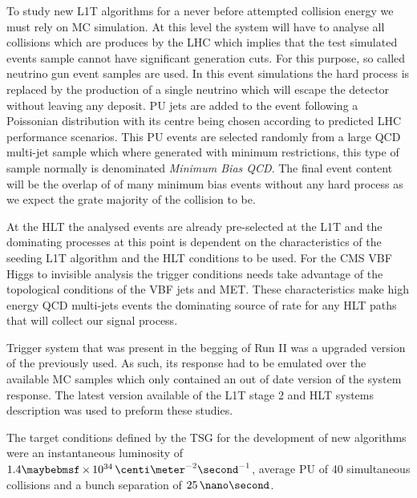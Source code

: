 
To study new \gls{L1T} algorithms for a never before attempted collision energy we must rely on \gls{MC} simulation. At this level the system will have to analyse all collisions which are produces by the \gls{LHC} which implies that the test simulated events sample cannot have significant generation cuts. For this purpose, so called neutrino gun event samples are used. In this event simulations the hard process is replaced by the production of a single neutrino which will escape the detector without leaving any deposit. \acrfull{PU} jets are added to the event following a Poissonian distribution with its centre being chosen according to predicted \gls{LHC} performance scenarios. This \gls{PU} events are selected randomly from a large \gls{QCD} multi-jet sample which where generated with minimum restrictions, this type of sample normally is denominated \textit{Minimum Bias QCD}. The final event content will be the overlap of of many minimum bias events without any hard process as we expect the grate majority of the collision to be.

At the \gls{HLT} the analysed events are already pre-selected at the \gls{L1T} and the dominating processes at this point is dependent on the characteristics of the seeding \gls{L1T} algorithm and the \gls{HLT} conditions to be used. For the \gls{CMS} \gls{VBF} Higgs to invisible analysis the trigger conditions needs take advantage of the topological conditions of the \gls{VBF} jets and \gls{MET}. These characteristics make high energy \gls{QCD} multi-jets events the dominating source of rate for any \gls{HLT} paths that will collect our signal process.

Trigger system that was present in the begging of Run II was a upgraded version of the previously used. As such, its response had to be emulated over the available \gls{MC} samples which only contained an out of date version of the system response. The latest version available of the \gls{L1T} stage 2 and \gls{HLT} systems description was used to preform these studies.

The target conditions defined by the \gls{TSG} for the development of new algorithms were an instantaneous luminosity of  $1.4 \times 10^{34}\,\centi\meter^{-2}\second^{-1}$, average \gls{PU} of 40 simultaneous collisions and a bunch separation of $25\,\nano\second$.


